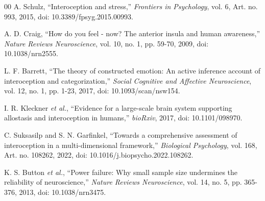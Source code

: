 \documentclass[conference]{IEEEtran}
\begin{document}
\begin{thebibliography}{00}
A. Schulz, ``Interoception and stress,'' \emph{Frontiers in Psychology}, vol. 6, Art. no. 993, 2015, doi: 10.3389/fpsyg.2015.00993.

A. D. Craig, ``How do you feel - now? The anterior insula and human awareness,'' \emph{Nature Reviews Neuroscience}, vol. 10, no. 1, pp. 59-70, 2009, doi: 10.1038/nrn2555.

L. F. Barrett, ``The theory of constructed emotion: An active inference account of interoception and categorization,'' \emph{Social Cognitive and Affective Neuroscience}, vol. 12, no. 1, pp. 1-23, 2017, doi: 10.1093/scan/nsw154.

I. R. Kleckner \emph{et al.}, ``Evidence for a large-scale brain system supporting allostasis and interoception in humans,'' \emph{bioRxiv}, 2017, doi: 10.1101/098970.

C. Suksasilp and S. N. Garfinkel, ``Towards a comprehensive assessment of interoception in a multi-dimensional framework,'' \emph{Biological Psychology}, vol. 168, Art. no. 108262, 2022, doi: 10.1016/j.biopsycho.2022.108262.

K. S. Button \emph{et al.}, ``Power failure: Why small sample size undermines the reliability of neuroscience,'' \emph{Nature Reviews Neuroscience}, vol. 14, no. 5, pp. 365-376, 2013, doi: 10.1038/nrn3475.

\end{thebibliography}
\end{document}
